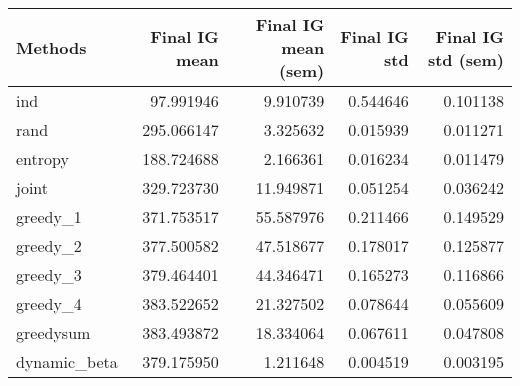 \begin{tabular}{lrrrr}
\toprule
      Methods &  Final IG mean &  Final IG mean (sem) &  Final IG std &  Final IG std (sem) \\
\midrule
          ind &      97.991946 &             9.910739 &      0.544646 &            0.101138 \\
         rand &     295.066147 &             3.325632 &      0.015939 &            0.011271 \\
      entropy &     188.724688 &             2.166361 &      0.016234 &            0.011479 \\
        joint &     329.723730 &            11.949871 &      0.051254 &            0.036242 \\
     greedy\_1 &     371.753517 &            55.587976 &      0.211466 &            0.149529 \\
     greedy\_2 &     377.500582 &            47.518677 &      0.178017 &            0.125877 \\
     greedy\_3 &     379.464401 &            44.346471 &      0.165273 &            0.116866 \\
     greedy\_4 &     383.522652 &            21.327502 &      0.078644 &            0.055609 \\
    greedysum &     383.493872 &            18.334064 &      0.067611 &            0.047808 \\
 dynamic\_beta &     379.175950 &             1.211648 &      0.004519 &            0.003195 \\
\bottomrule
\end{tabular}

